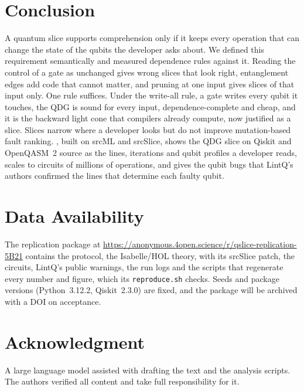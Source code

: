 \section{Conclusion}\label{sec:conclusion}

A quantum slice supports comprehension only if it keeps every operation that can change the state of the
qubits the developer asks about. We defined this requirement semantically and measured dependence rules
against it. Reading the control of a gate as unchanged gives wrong slices that look right, entanglement
edges add code that cannot matter, and pruning at one input gives slices of that input only. One rule suffices. Under the write-all rule, a gate writes every qubit it touches, the QDG is
sound for every input, dependence-complete and cheap, and it is the backward light cone that compilers
already compute, now justified as a slice. Slices narrow where a developer looks but do not improve mutation-based
fault ranking. \tool{}, built on srcML and srcSlice, shows the QDG slice on Qiskit and OpenQASM~2 source as the
lines, iterations and qubit profiles a developer reads, scales to circuits of millions of operations, and
gives the qubit bugs that LintQ's authors confirmed the lines that determine each faulty qubit.

\section*{Data Availability}
The replication package at \url{https://anonymous.4open.science/r/qslice-replication-5B21} contains the
protocol, the Isabelle/HOL theory, \tool{} with its srcSlice patch, the circuits, LintQ's public warnings, the
run logs and the scripts that regenerate every number and figure, which its \texttt{reproduce.sh} checks. Seeds and package versions (Python~3.12.2,
Qiskit~2.3.0) are fixed, and the package will be archived with a DOI on acceptance.

\section*{Acknowledgment}
A large language model assisted with drafting the text and the analysis scripts. The authors verified all
content and take full responsibility for it.
